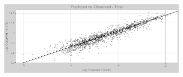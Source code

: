 \FloatBarrier
\newpage
\begin{figure}
\begin{subfigure}{1\textwidth}
\centering
\includegraphics[width=.99\textheight, height=0.99\textwidth, angle=90, origin=c]{Images/electricity_psf_nn_full_pvo_transformed.png}
\end{subfigure}
\end{figure}
\FloatBarrier
\newpage
